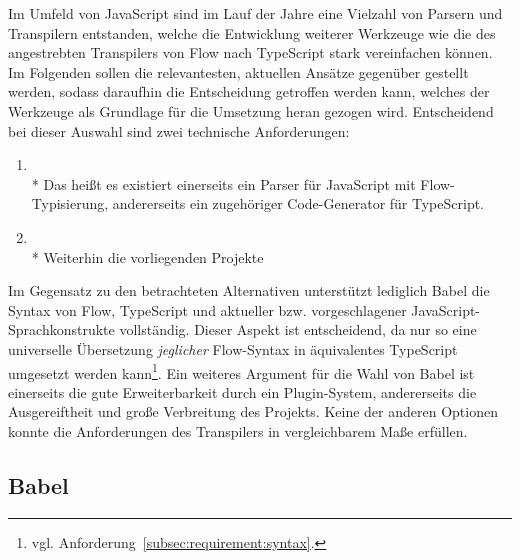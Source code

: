 Im Umfeld von JavaScript sind im Lauf der Jahre eine Vielzahl von Parsern und Transpilern entstanden, welche die Entwicklung weiterer Werkzeuge wie die des angestrebten Transpilers von Flow nach TypeScript stark vereinfachen können. Im Folgenden sollen die relevantesten, aktuellen Ansätze gegenüber gestellt werden, sodass daraufhin die Entscheidung getroffen werden kann, welches der Werkzeuge als Grundlage für die Umsetzung heran gezogen wird. Entscheidend bei dieser Auswahl sind zwei technische Anforderungen:

\begin{enumerate}
  \item {}\\*
    Das heißt es existiert einerseits ein Parser für JavaScript mit Flow-Typisierung, andererseits ein zugehöriger Code-Generator für TypeScript.
  \item {}\\*
    Weiterhin die vorliegenden Projekte
\end{enumerate}




Im Gegensatz zu den betrachteten Alternativen unterstützt lediglich Babel die Syntax von Flow, TypeScript und aktueller bzw. vorgeschlagener JavaScript-Sprachkonstrukte vollständig. Dieser Aspekt ist entscheidend, da nur so eine universelle Übersetzung \emph{jeglicher} Flow-Syntax in äquivalentes TypeScript umgesetzt werden kann\footnote{vgl. Anforderung~\ref{subsec:requirement:syntax}.}.
Ein weiteres Argument für die Wahl von Babel ist einerseits die gute Erweiterbarkeit durch ein Plugin-System, andererseits die Ausgereiftheit und große Verbreitung des Projekts. Keine der anderen Optionen konnte die Anforderungen des Transpilers in vergleichbarem Maße erfüllen.

\subsection{Babel}
\label{sec:babel}

